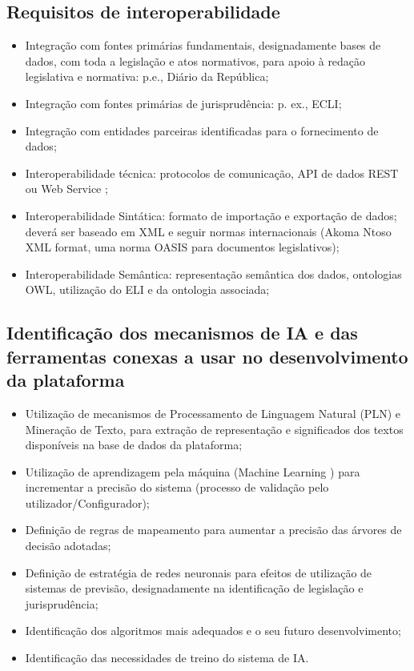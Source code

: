\subsection{Requisitos de interoperabilidade}

\begin{itemize}
\item Integração com fontes primárias fundamentais, designadamente bases de dados, com toda a
legislação e atos normativos, para apoio à redação legislativa e normativa: p.e., Diário da
República;
\item Integração com fontes primárias de jurisprudência: p. ex., ECLI;
\item Integração com entidades parceiras identificadas para o fornecimento de dados;
\item Interoperabilidade técnica: protocolos de comunicação, API de dados REST ou Web Service ;
\item Interoperabilidade Sintática: formato de importação e exportação de dados; deverá ser baseado
em XML e seguir normas internacionais (Akoma Ntoso XML format, uma norma OASIS para
documentos legislativos);
\item Interoperabilidade Semântica: representação semântica dos dados, ontologias OWL, utilização
do ELI e da ontologia associada;
\end{itemize}

\subsection{Identificação dos mecanismos de IA e das ferramentas conexas a usar no desenvolvimento
da plataforma}

\begin{itemize}
\item Utilização de mecanismos de Processamento de Linguagem Natural (PLN) e Mineração de
Texto, para extração de representação e significados dos textos disponíveis na base de dados
da plataforma;
\item Utilização de aprendizagem pela máquina (Machine Learning ) para incrementar a precisão do
sistema (processo de validação pelo utilizador/Configurador);
\item Definição de regras de mapeamento para aumentar a precisão das árvores de decisão
adotadas;
\item Definição de estratégia de redes neuronais para efeitos de utilização de sistemas de previsão,
designadamente na identificação de legislação e jurisprudência;
\item Identificação dos algoritmos mais adequados e o seu futuro desenvolvimento;
\item Identificação das necessidades de treino do sistema de IA.
\end{itemize}


